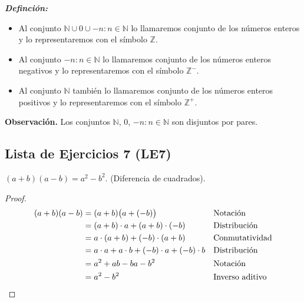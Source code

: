 \documentclass[11pt]{article}
\newcommand{\N}{\mathbb{N}}
\newcommand{\Z}{\mathbb{Z}}
\newcommand{\bfit}[1]{\textbf{\textit{#1}}}
\begin{document}
  \bfit{Definción:} \begin{itemize}
    \item Al conjunto $\N \cup {0} \cup {-n: n\in \N}$ lo llamaremos conjunto de los números enteros y lo representaremos con el símbolo $\Z$.
    \item Al conjunto ${-n: n\in \N}$ lo llamaremos conjunto de los números enteros negativos y lo representaremos con el símbolo $\Z^-$.
    \item Al conjunto $\N$ también lo llamaremos conjunto de los números enteros positivos y lo representaremos con el símbolo $\Z^+$.
   \end{itemize}
   
   \textbf{Observación.} Los conjuntos $\N$, ${0}$, ${-n: n\in \N}$ son disjuntos por pares.

\subsection*{Lista de Ejercicios 7 (LE7)}

$(a+b)(a-b)=a^2-b^2$. (Diferencia de cuadrados).
\begin{proof} 
 \begin{align*}
 (a+b)(a-b) &= (a+b)\bigl(a+(-b)\bigr) && \text{Notación}\\
 &= (a+b)\cdot a + (a+b)\cdot (-b) && \text{Distribución}\\
 &= a\cdot (a+b) + (-b)\cdot (a+b) && \text{Conmutatividad}\\
 &= a\cdot a + a\cdot b + (-b)\cdot a + (-b) \cdot b && \text{Distribución}\\
 &= a^2+ ab -ba -b^2 && \text{Notación}\\
 &=a^2-b^2 && \text{Inverso aditivo} \qedhere
 \end{align*} 
\end{proof}
\end{document}
